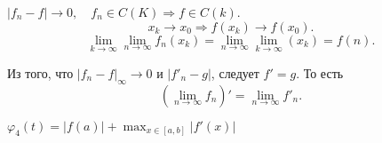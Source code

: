 \begin{rem}
    $ \lvert f_n - f \rvert  \to  0, \quad f_n \in C(K) \Longrightarrow f \in C(k) $.
    $$ x_k \to  x_0 \Longrightarrow f(x_k) \to  f(x_0).$$
    \[
	\lim_{k \to  \infty} \lim_{n \to \infty} f_n(x_k) = \lim_{n \to \infty} \lim_{k \to \infty} (x_k)  = f(n)
    .\] 
\end{rem}
\begin{rem}
    Из того, что $ \lvert f_n - f \rvert _{\infty} \to  0$ и $ \lvert f'_n - g \rvert$, следует  $ f' = g$.
    То есть 
     \[
	 \left( \lim_{n \to \infty} f_n \right) ' = \lim_{n \to \infty} f'_n
    .\] 
\end{rem}
\begin{prac}
    $ \varphi_4(t) = \left| f(a) \right|  + \max_{x \in  [a, b]} \left| f'(x) \right| $
\end{prac}
% 
